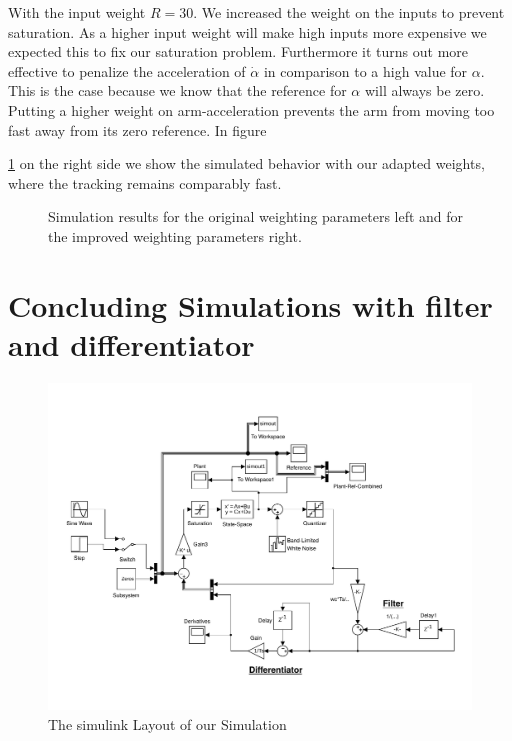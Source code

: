 \documentclass[ twoside,openright,titlepage,numbers=noenddot,headinclude,%
                footinclude=true,cleardoublepage=empty,abstractoff, %
                BCOR=5mm,paper=a4,fontsize=11pt,%
                ngerman,american,%
                ]{scrreprt}
\begin{document}
With the input weight $R = 30$. We increased the weight on the inputs to prevent saturation. As a higher input weight will make high inputs more expensive we expected this to fix our saturation problem. Furthermore it turns out more effective to penalize the acceleration of $\dot{\alpha}$ in comparison to a high value for $\alpha$. This is the case because we know that the reference for $\alpha$ will always be zero. Putting a higher weight on arm-acceleration prevents the arm from moving too fast away from its zero reference. In figure~{\ref{fig:stepResponse} on the right side we show the simulated behavior with our adapted weights, where the tracking remains comparably fast. 


\begin{figure}


\caption{Simulation results for the original weighting parameters left and for the improved weighting parameters right.}
\label{fig:stepResponse}
\end{figure}


\section{Concluding Simulations with filter and differentiator}
\begin{figure}
\includegraphics[scale=0.5]{images/simModel.pdf}
\caption{The simulink Layout of our Simulation}
\end{figure}



}
\end{document}

